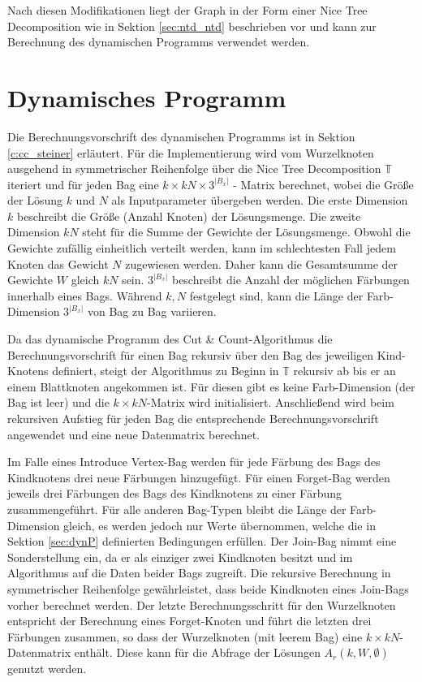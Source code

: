 Nach diesen Modifikationen liegt der Graph in der Form einer Nice Tree Decomposition wie in Sektion \ref{sec:ntd_ntd} beschrieben vor und kann zur Berechnung des dynamischen Programms verwendet werden.

\section{Dynamisches Programm}
\label{sec:impl_dynP}
Die Berechnungsvorschrift des dynamischen Programms ist in Sektion \ref{c:cc_steiner} erläutert. 
Für die Implementierung wird vom Wurzelknoten ausgehend in symmetrischer Reihenfolge über die Nice Tree Decomposition $\mathbb{T}$ iteriert und für jeden Bag eine $k \times kN \times 3^{|B_x|}$ - Matrix berechnet, wobei die Größe der Lösung $k$ und $N$ als Inputparameter übergeben werden. 
Die erste Dimension $k$ beschreibt die Größe (Anzahl Knoten) der Lösungsmenge. 
Die zweite Dimension $kN$ steht für die Summe der Gewichte der Lösungsmenge. 
Obwohl die Gewichte zufällig einheitlich verteilt werden, kann im schlechtesten Fall jedem Knoten das Gewicht $N$ zugewiesen werden. 
Daher kann die Gesamtsumme der Gewichte $W$ gleich $kN$ sein.
$3^{|B_x|}$ beschreibt die Anzahl der möglichen Färbungen innerhalb eines Bags. 
Während $k,N$ festgelegt sind, kann die Länge der Farb-Dimension $3^{|B_x|}$ von Bag zu Bag variieren. 

Da das dynamische Programm des Cut \& Count-Algorithmus die Berechnungsvorschrift für einen Bag rekursiv über den Bag des jeweiligen Kind-Knotens definiert, steigt der Algorithmus zu Beginn in $\mathbb{T}$ rekursiv ab bis er an einem Blattknoten angekommen ist. 
Für diesen gibt es keine Farb-Dimension (der Bag ist leer) und die $k \times kN$-Matrix wird initialisiert. 
Anschließend wird beim rekursiven Aufstieg für jeden Bag die entsprechende Berechnungsvorschrift angewendet und eine neue Datenmatrix berechnet. 

Im Falle eines \glqq Introduce Vertex\grqq -Bag werden für jede Färbung des Bags des Kindknotens drei neue Färbungen hinzugefügt.
Für einen \glqq Forget\grqq -Bag werden jeweils drei Färbungen des Bags des Kindknotens zu einer Färbung zusammengeführt.
Für alle anderen Bag-Typen bleibt die Länge der Farb-Dimension gleich, es werden jedoch nur Werte übernommen, welche die in Sektion \ref{sec:dynP} definierten Bedingungen erfüllen. 
Der \glqq Join\grqq -Bag nimmt eine Sonderstellung ein, da er als einziger zwei Kindknoten besitzt und im Algorithmus auf die Daten beider Bags zugreift. 
Die rekursive Berechnung in symmetrischer Reihenfolge gewährleistet, dass beide Kindknoten eines \glqq Join\grqq -Bags vorher berechnet werden. 
Der letzte Berechnungsschritt für den Wurzelknoten entspricht der Berechnung eines \glqq Forget\grqq -Knoten und führt die letzten drei Färbungen zusammen, so dass der Wurzelknoten (mit leerem Bag) eine $k \times kN$-Datenmatrix enthält. 
Diese kann für die Abfrage der Lösungen $A_r(k,W,\emptyset)$ genutzt werden.

